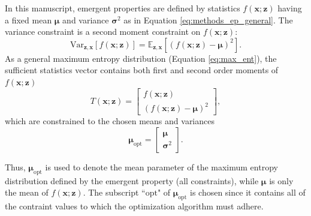 \documentclass[11pt]{article}
\begin{document}
In this manuscript, emergent properties are defined by statistics $f(\mathbf{x}; \mathbf{z})$ having a fixed mean $\bm{\mu}$ and variance $\bm{\sigma}^2$ as in Equation \ref{eq:methods_ep_general}.
The variance constraint is a second moment constraint on $f(\mathbf{x}; \mathbf{z})$:
 \begin{equation}
\text{Var}_{\mathbf{z},\mathbf{x}}\left[f(\mathbf{x}; \mathbf{z})\right] = \mathbb{E}_{\mathbf{z},\mathbf{x}}\left[\left( f(\mathbf{x}; \mathbf{z}) - \bm{\mu}\right) ^2\right].
\end{equation}
As a general maximum entropy distribution (Equation \ref{eq:max_ent}), the sufficient statistics vector contains both first and second order moments of $f(\mathbf{x}; \mathbf{z})$
\begin{equation} \label{eq:moments}
T(\mathbf{x}; \mathbf{z}) = \begin{bmatrix} f(\mathbf{x}; \mathbf{z}) \\ \left( f(\mathbf{x}; \mathbf{z}) - \bm{\mu} \right)^2 \end{bmatrix},
\end{equation}
which are constrained to the chosen means and variances
\begin{equation} \label{eq:mu_opt}
\bm{\mu}_{\text{opt}} = \begin{bmatrix} \bm{\mu} \\ \bm{\sigma}^2 \end{bmatrix}.
\end{equation}

Thus, $\bm{\mu}_{\text{opt}}$ is used to denote the mean parameter of the maximum entropy distribution defined by the emergent property (all constraints), while $\bm{\mu}$ is only the mean of $f(\mathbf{x}; \mathbf{z})$.
The subscript ``$\text{opt}$" of $\bm{\mu}_{\text{opt}}$ is chosen since it contains all of the contraint values to which the optimization algorithm must adhere.
\end{document}

